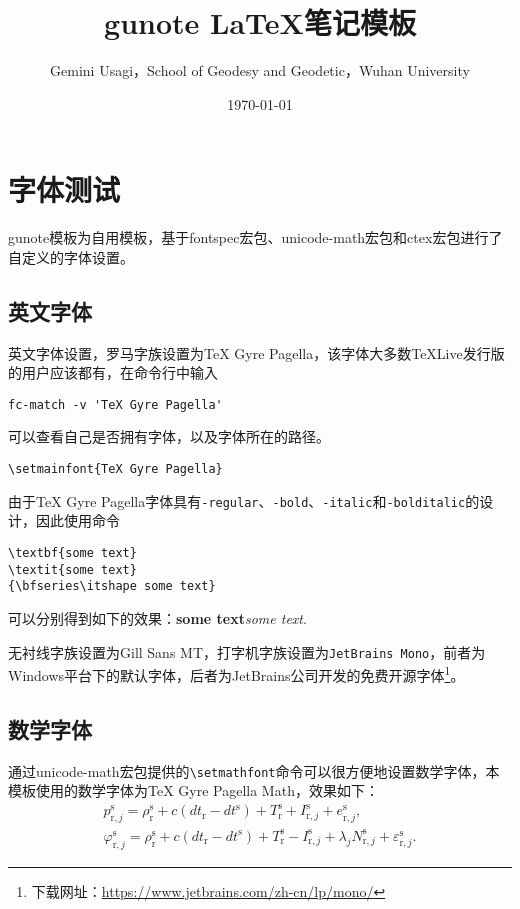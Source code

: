\documentclass{gunote}
\title{gunote \LaTeX{}笔记模板}
\author{Gemini Usagi，School of Geodesy and Geodetic，Wuhan University}
\date{\today}
\newcommand{\cmd}[1]{\texttt{\backslash #1}}
\begin{document}
\maketitle
\tableofcontents

\section{字体测试}
\textsf{gunote}模板为自用模板，基于\textsf{fontspec}宏包、\textsf{unicode-math}宏包和\textsf{ctex}宏包进行了自定义的字体设置。
\subsection{英文字体}
英文字体设置，罗马字族设置为TeX Gyre Pagella，该字体大多数\TeX{}Live发行版的用户应该都有，在命令行中输入
\begin{verbatim}
fc-match -v 'TeX Gyre Pagella'
\end{verbatim}
可以查看自己是否拥有字体，以及字体所在的路径。
\begin{verbatim}
\setmainfont{TeX Gyre Pagella}
\end{verbatim}
由于TeX Gyre Pagella字体具有\texttt{-regular}、\texttt{-bold}、\texttt{-italic}和\texttt{-bolditalic}的设计，因此使用命令
\begin{verbatim}
\textbf{some text}
\textit{some text}
{\bfseries\itshape some text}
\end{verbatim}
可以分别得到如下的效果：\textbf{some text}\quad\textit{some text}.

无衬线字族设置为\textsf{Gill Sans MT}，打字机字族设置为\texttt{JetBrains Mono}，前者为Windows平台下的默认字体，后者为JetBrains公司开发的免费开源字体\footnote{下载网址：\url{https://www.jetbrains.com/zh-cn/lp/mono/}}。
\subsection{数学字体}
通过\textsf{unicode-math}宏包提供的\cmd{setmathfont}命令可以很方便地设置数学字体，本模板使用的数学字体为TeX Gyre Pagella Math，效果如下：
{
\def\rcv{\mathrm{r}}
\def\sat{\mathrm{s}}
\begin{gather}
  p_{\rcv,j}^\sat=\rho_\rcv^\sat+c(dt_\rcv-dt^\sat)+T_\rcv^\sat+I_{\rcv,j}^\sat+e_{\rcv,j}^\sat,\\
  \varphi_{\rcv,j}^\sat=\rho_\rcv^\sat+c(dt_\rcv-dt^\sat)+T_\rcv^\sat-I_{\rcv,j}^\sat+\lambda_j N_{\rcv,j}^\sat+\varepsilon_{\rcv,j}^\sat.
\end{gather}
}
\end{document}
